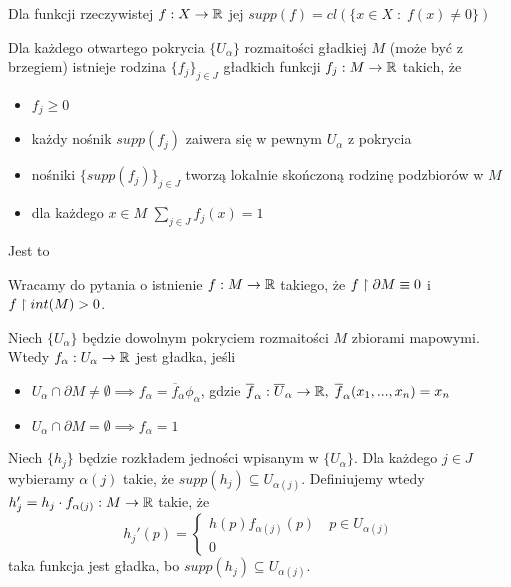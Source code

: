 \begin{definicja}
Dla funkcji rzeczywistej $f:X\to\mathbb{R}$ jej  $supp(f)=cl(\{x\in X\;:\;f(x)\neq0\})$
\end{definicja}

\begin{tw} Dla każdego otwartego pokrycia $\{U_\alpha\}$ rozmaitości gładkiej $M$ (może być z brzegiem) istnieje rodzina $\{f_j\}_{j\in J}$ gładkich funkcji $f_j:M\to\mathbb{R}$ takich, że
\begin{itemize}
    \item $f_j\geq0$
    \item każdy nośnik $supp(f_j)$ zaiwera się w pewnym $U_\alpha$ z pokrycia
    \item nośniki $\{supp(f_j)\}_{j\in J}$ tworzą lokalnie skończoną rodzinę podzbiorów w $M$
    \item dla każdego $x\in M$ $\sum\limits_{j\in J}f_j(x)=1$
\end{itemize}
Jest to 
\end{tw}

Wracamy do pytania o istnienie $f:M\to\mathbb{R}$ takiego, że $f\upharpoonright\partial M\equiv 0$ i $f\upharpoonright int(M)>0$. 

Niech $\{U_\alpha\}$ będzie dowolnym pokryciem rozmaitości $M$ zbiorami mapowymi. Wtedy $f_\alpha:U_\alpha\to\mathbb{R}$ jest gładka, jeśli
\begin{itemize}
    \item $U_\alpha\cap\partial M\neq\emptyset\implies f_\alpha=\overline f_\alpha\phi_\alpha$, gdzie $\overline f_\alpha:\overline U_\alpha\to\mathbb{R},\; \overline f_\alpha(x_1,...,x_n)=x_n$
    \item $U_\alpha\cap\partial M=\emptyset\implies f_\alpha=1$
\end{itemize}
Niech $\{h_j\}$ będzie rozkładem jedności wpisanym w $\{U_\alpha\}$. Dla każdego $j\in J$ wybieramy $\alpha(j)$ takie, że $supp(h_j)\subseteq U_{\alpha(j)}$. Definiujemy wtedy $h_j'=h_j\cdot f_{\alpha(j)}:M\to \mathbb{R}$ takie, że
$$h_j'(p)=\begin{cases}
    h(p)f_{\alpha(j)}(p)\quad p\in U_{\alpha(j)}\\
    0
\end{cases}$$
taka funkcja jest gładka, bo $supp(h_j)\subseteq U_{\alpha(j)}$.